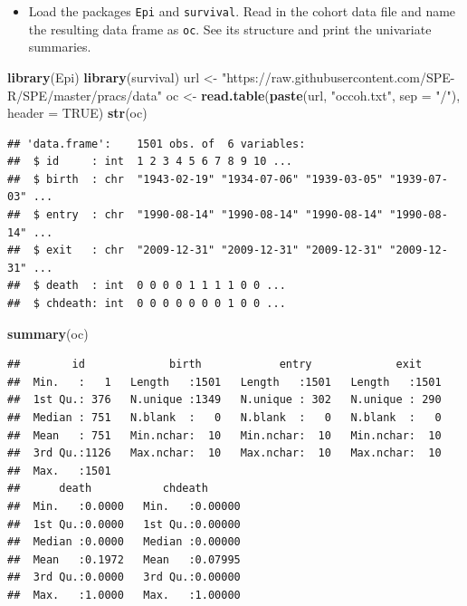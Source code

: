 \documentclass[
]{book}
\newenvironment{Shaded}{\begin{snugshade}}{\end{snugshade}}
\newcommand{\AttributeTok}[1]{\textcolor[rgb]{0.13,0.29,0.53}{#1}}
\newcommand{\ConstantTok}[1]{\textcolor[rgb]{0.56,0.35,0.01}{#1}}
\newcommand{\FunctionTok}[1]{\textcolor[rgb]{0.13,0.29,0.53}{\textbf{#1}}}
\newcommand{\NormalTok}[1]{#1}
\newcommand{\OtherTok}[1]{\textcolor[rgb]{0.56,0.35,0.01}{#1}}
\newcommand{\StringTok}[1]{\textcolor[rgb]{0.31,0.60,0.02}{#1}}
\providecommand{\tightlist}{%
  \setlength{\itemsep}{0pt}\setlength{\parskip}{0pt}}
\begin{document}
\begin{itemize}
\tightlist
\item
  Load the packages \texttt{Epi} and \texttt{survival}.
  Read in the cohort data file and name
  the resulting data frame as \texttt{oc}.
  See its structure and print the univariate summaries.
\end{itemize}

\begin{Shaded}
\begin{Highlighting}[]
\FunctionTok{library}\NormalTok{(Epi)}
\FunctionTok{library}\NormalTok{(survival)}
\NormalTok{url }\OtherTok{\textless{}{-}} \StringTok{"https://raw.githubusercontent.com/SPE{-}R/SPE/master/pracs/data"}
\NormalTok{oc }\OtherTok{\textless{}{-}} \FunctionTok{read.table}\NormalTok{(}\FunctionTok{paste}\NormalTok{(url, }\StringTok{"occoh.txt"}\NormalTok{, }\AttributeTok{sep =} \StringTok{"/"}\NormalTok{), }\AttributeTok{header =} \ConstantTok{TRUE}\NormalTok{)}
\FunctionTok{str}\NormalTok{(oc)}
\end{Highlighting}
\end{Shaded}

\begin{verbatim}
## 'data.frame':    1501 obs. of  6 variables:
##  $ id     : int  1 2 3 4 5 6 7 8 9 10 ...
##  $ birth  : chr  "1943-02-19" "1934-07-06" "1939-03-05" "1939-07-03" ...
##  $ entry  : chr  "1990-08-14" "1990-08-14" "1990-08-14" "1990-08-14" ...
##  $ exit   : chr  "2009-12-31" "2009-12-31" "2009-12-31" "2009-12-31" ...
##  $ death  : int  0 0 0 0 1 1 1 1 0 0 ...
##  $ chdeath: int  0 0 0 0 0 0 0 1 0 0 ...
\end{verbatim}

\begin{Shaded}
\begin{Highlighting}[]
\FunctionTok{summary}\NormalTok{(oc)}
\end{Highlighting}
\end{Shaded}

\begin{verbatim}
##        id             birth            entry             exit     
##  Min.   :   1   Length   :1501   Length   :1501   Length   :1501  
##  1st Qu.: 376   N.unique :1349   N.unique : 302   N.unique : 290  
##  Median : 751   N.blank  :   0   N.blank  :   0   N.blank  :   0  
##  Mean   : 751   Min.nchar:  10   Min.nchar:  10   Min.nchar:  10  
##  3rd Qu.:1126   Max.nchar:  10   Max.nchar:  10   Max.nchar:  10  
##  Max.   :1501                                                     
##      death           chdeath       
##  Min.   :0.0000   Min.   :0.00000  
##  1st Qu.:0.0000   1st Qu.:0.00000  
##  Median :0.0000   Median :0.00000  
##  Mean   :0.1972   Mean   :0.07995  
##  3rd Qu.:0.0000   3rd Qu.:0.00000  
##  Max.   :1.0000   Max.   :1.00000
\end{verbatim}
\end{document}
